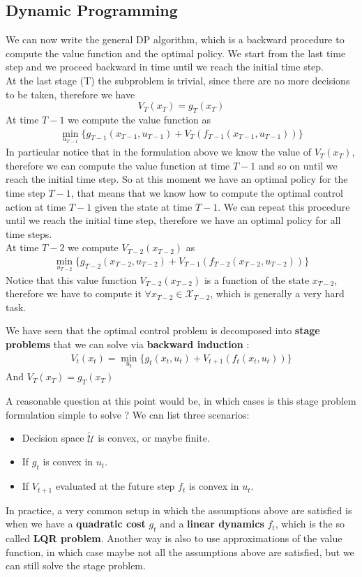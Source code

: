 \subsection{Dynamic Programming}
We can now write the general DP algorithm, which is a backward procedure to compute the value function and the optimal policy. We start from the last time step and we proceed backward in time until we reach the initial time step.\\
At the last stage (T) the subproblem is trivial, since there are no more decisions to be taken, therefore we have
$$V_T(x_T) = g_T(x_T)$$
At time $T-1$ we compute the value function as
\begin{align*}
    \min_{u_{T-1}} \{ g_{T-1}(x_{T-1},u_{T-1}) + V_T(f_{T-1}(x_{T-1},u_{T-1})) \}
\end{align*}
In particular notice that in the formulation above we know the value of $V_T(x_T)$, therefore we can compute the value function at time $T-1$ and so on until we reach the initial time step. So at this moment we have an optimal policy for the time step $T-1$, that means that we know how to compute the optimal control action at time $T-1$ given the state at time $T-1$. We can repeat this procedure until we reach the initial time step, therefore we have an optimal policy for all time steps.\\
At time $T-2$ we compute $V_{T-2}(x_{T-2})$ as
\begin{align*}
    \min_{u_{T-2}} \{ g_{T-2}(x_{T-2},u_{T-2}) + V_{T-1}(f_{T-2}(x_{T-2},u_{T-2})) \}
\end{align*}
Notice that this value function $V_{T-2}(x_{T-2})$ is a function of the state $x_{T-2}$, therefore we have to compute it $\forall x_{T-2} \in \mathcal{X}_{T-2}$, which is generally a very hard task.\\

\begin{theorembox}
We have seen that the optimal control problem is decomposed into \textbf{stage problems} that we can solve via \textbf{backward induction} :
\begin{align}
V_t(x_t) = \min_{u_t} \{ g_t(x_t,u_t) + V_{t+1}(f_t(x_t,u_t)) \}
\end{align}
And $V_T(x_T) = g_T(x_T)$
\end{theorembox}
A reasonable question at this point would be, in which cases is this stage problem formulation simple to solve ? We can list three scenarios:
\begin{itemize}
    \item Decision space $\mathcal{\tilde{U}}$ is convex, or maybe finite.
    \item If $g_t$ is convex in $u_t$.
    \item If $V_{t+1}$ evaluated at the future step $f_t$ is convex in $u_t$.
\end{itemize}
In practice, a very common setup in which the assumptions above are satisfied is when we have a \textbf{quadratic cost} $g_t$ and a \textbf{linear dynamics} $f_t$, which is the so called \textbf{LQR problem}. Another way is also to use approximations of the value function, in which case maybe not all the assumptions above are satisfied, but we can still solve the stage problem.

